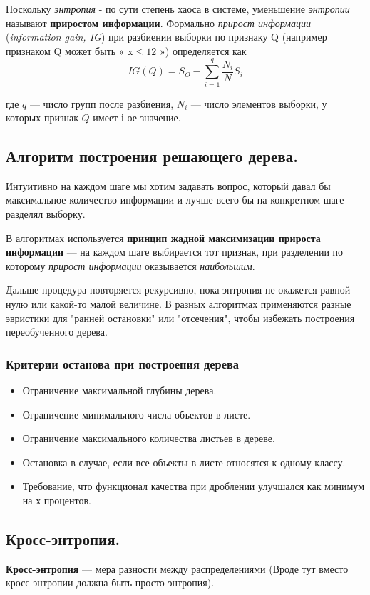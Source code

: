 Поскольку \textit{энтропия} - по сути степень хаоса в системе, уменьшение \textit{энтропии} называют \textbf{приростом информации}. Формально \textit{прирост информации} (\textit{information gain, IG}) при разбиении выборки по признаку Q (например признаком Q может быть « $\mathrm{x} \leq 12$ ») определяется как
$$
I G(Q)=S_{O}-\sum_{i=1}^{q} \frac{N_{i}}{N} S_{i}
$$


где $q$ --- число групп после разбиения, $N_i$ --- число элементов выборки, у которых признак $Q$ имеет $і$-ое значение.

\subsection{Алгоритм построения решающего дерева.}

Интуитивно на каждом шаге мы хотим задавать вопрос, который давал бы максимальное количество информации и лучше всего бы на конкретном шаге разделял выборку.

В алгоритмах используется \textbf{принцип жадной максимизации прироста информации} --- на каждом шаге выбирается тот признак, при разделении по которому \textit{прирост информации} оказывается \textit{наибольшим}.

Дальше процедура повторяется рекурсивно, пока энтропия не окажется равной нулю или какой-то малой величине.
В разных алгоритмах применяются разные эвристики для "ранней остановки" или "отсечения", чтобы избежать построения переобученного дерева.


\subsubsection{Критерии останова при построения дерева}

\begin{itemize}
    \item  Ограничение максимальной глубины дерева.
    \item  Ограничение минимального числа объектов в листе.
    \item  Ограничение максимального количества листьев в дереве.
    \item  Остановка в случае, если все объекты в листе относятся к одному классу.
    \item  Требование, что функционал качества при дроблении улучшался как минимум на х процентов.
\end{itemize}
\subsection{Кросс-энтропия.}

\textbf{Кросс-энтропия} --- мера разности между распределениями (Вроде тут вместо кросс-энтропии должна быть просто энтропия).


